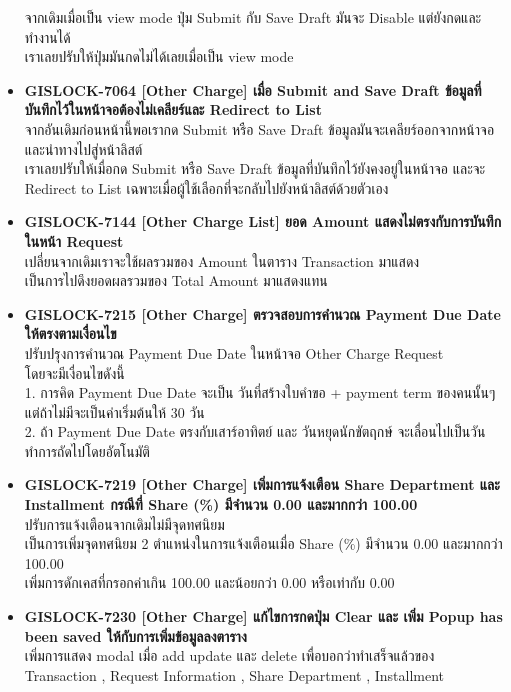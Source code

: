 \begin{itemize}
        จากเดิมเมื่อเป็น view mode ปุ่ม Submit กับ Save Draft มันจะ Disable แต่ยังกดและทำงานได้ \\
        เราเลยปรับให้ปุ่มมันกดไม่ได้เลยเมื่อเป็น view mode 
    \item \textbf{{GISLOCK-7064 [Other Charge] เมื่อ Submit and Save Draft ข้อมูลที่บันทึกไว้ในหน้าจอต้องไม่เคลียร์และ Redirect to List}} \\
        จากอันเดิมก่อนหน้านี้พอเรากด Submit หรือ Save Draft ข้อมูลมันจะเคลียร์ออกจากหน้าจอและนำทางไปสู่หน้าลิสต์ \\
        เราเลยปรับให้เมื่อกด Submit หรือ Save Draft ข้อมูลที่บันทึกไว้ยังคงอยู่ในหน้าจอ และจะ Redirect to List เฉพาะเมื่อผู้ใช้เลือกที่จะกลับไปยังหน้าลิสต์ด้วยตัวเอง
    \item \textbf{{GISLOCK-7144 [Other Charge List] ยอด Amount แสดงไม่ตรงกับการบันทึกในหน้า Request}} \\
        เปลี่ยนจากเดิมเราจะใช้ผลรวมของ Amount ในตาราง Transaction มาแสดง \\
        เป็นการไปดึงยอดผลรวมของ Total Amount มาแสดงแทน
    \item \textbf{{GISLOCK-7215 [Other Charge] ตรวจสอบการคำนวณ Payment Due Date ให้ตรงตามเงื่อนไข}} \\
        ปรับปรุงการคำนวณ Payment Due Date ในหน้าจอ Other Charge Request \\
        โดยจะมีเงื่อนไขดังนี้ \\
        1. การคิด Payment Due Date จะเป็น วันที่สร้างใบคำขอ + payment term ของคนนั้นๆ แต่ถ้าไม่มีจะเป็นค่าเริ่มต้นให้ 30 วัน\\
        2. ถ้า Payment Due Date ตรงกับเสาร์อาทิตย์ และ วันหยุดนักขัตฤกษ์ จะเลื่อนไปเป็นวันทำการถัดไปโดยอัตโนมัติ
    \item \textbf{{GISLOCK-7219 [Other Charge] เพิ่มการแจ้งเตือน Share Department และ Installment กรณีที่ Share (\%) มีจำนวน 0.00 และมากกว่า 100.00}} \\
        ปรับการแจ้งเตือนจากเดิมไม่มีจุดทศนิยม \\
        เป็นการเพิ่มจุดทศนิยม 2 ตำแหน่งในการแจ้งเตือนเมื่อ Share (\%) มีจำนวน 0.00 และมากกว่า 100.00 \\
        เพิ่มการดักเคสที่กรอกค่าเกิน 100.00 และน้อยกว่า 0.00 หรือเท่ากับ 0.00
    \item \textbf{{GISLOCK-7230 [Other Charge] แก้ไขการกดปุ่ม Clear และ เพิ่ม Popup has been saved ให้กับการเพิ่มข้อมูลลงตาราง}} \\
        เพิ่มการแสดง modal เมื่อ add update และ delete เพื่อบอกว่าทำเสร็จแล้วของ Transaction , Request Information , Share Department , Installment

\end{itemize}
